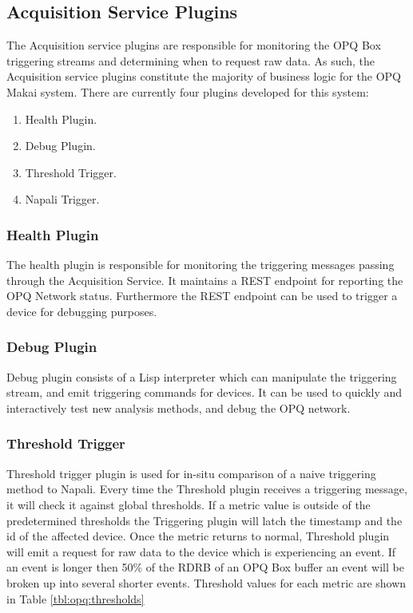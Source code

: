 \subsection{Acquisition Service Plugins}\label{subsec:acquisition-service-plugins}

The Acquisition service plugins are responsible for monitoring the OPQ Box triggering streams and determining when to request raw data.
As such, the Acquisition service plugins constitute the majority of business logic for the OPQ Makai system.
There are currently four plugins developed for this system:
\begin{enumerate}
	\item Health Plugin.
	\item Debug Plugin.
	\item Threshold Trigger.
	\item Napali Trigger.
\end{enumerate}

\subsubsection{Health Plugin}

The health plugin is responsible for monitoring the triggering messages passing through the Acquisition Service.
It maintains a REST endpoint for reporting the OPQ Network status.
Furthermore the REST endpoint can be used to trigger a device for debugging purposes.

\subsubsection{Debug Plugin}
Debug plugin consists of a Lisp interpreter which can manipulate the triggering stream, and emit triggering commands for devices.
It can be used to quickly and interactively test new analysis methods, and debug the OPQ network.

\subsubsection{Threshold Trigger}
Threshold trigger plugin is used for in-situ comparison of a naive triggering method to Napali.
Every time the Threshold plugin receives a triggering message, it will check it against global thresholds.
If a metric value is outside of the predetermined thresholds the Triggering plugin will latch the timestamp and the id of the affected device.
Once the metric returns to normal, Threshold plugin will emit a request for raw data to the device which is experiencing an event.
If an event is longer then 50\% of the RDRB of an OPQ Box buffer an event will be broken up into several shorter events.
Threshold values for each metric are shown in Table \ref{tbl:opq:thresholds}

